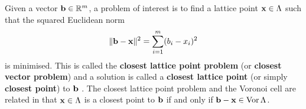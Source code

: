 

Given a vector $\mathbf{b} \in {\mathbb R}^m$, a problem of interest is to find a lattice point $\mathbf{x} \in \Lambda$ such that the squared Euclidean norm
\[
\| \mathbf{b} - \mathbf{x} \|^2 = \sum_{i=1}^m (b_i - x_i)^2 
\]  
is minimised.  This is called the \textbf{closest lattice point problem} (or \textbf{closest vector problem}) and a solution is called a \textbf{closest lattice point} (or simply \textbf{closest point}) to $\mathbf{b}$ \cite{Agrell2002,McKilliam2009CoxeterLattices,MicciancioVoulgaris_deterministic_jv_2013,McKilliam_closest_point_lattice_first_kind_2014}.  The closest lattice point problem and the Voronoi cell are related in that $\mathbf{x}\in\Lambda$ is a closest point to $\mathbf{b}$ if and only if $\mathbf{b} - \mathbf{x} \in \operatorname{Vor}\Lambda$.  

